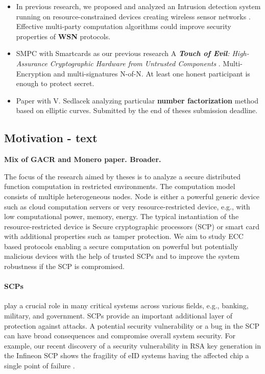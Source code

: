 \documentclass[
  digital, %
  twoside, %
  table,   %
  lof,     %
  lot,     %
]{fithesis3}
\theoremstyle{definition}
\theoremstyle{remark}
\begin{document}
\begin{ecmmnt}
\begin{itemize}
    \item In previous research, we proposed and analyzed an Intrusion detection system running on resource-constrained devices creating wireless sensor networks \cite{wsnprotectlayer}. Effective multi-party computation algorithms could improve security properties of {\bf{WSN}} protocols.
    
    \item SMPC with Smartcards as our previous research A {\it {\bf{Touch of Evil}}: High-Assurance Cryptographic Hardware from Untrusted Components} \cite{2017-ccs-mavroudis}. Multi-Encryption and multi-signatures N-of-N. At least one honest participant is enough to protect secret.
    
    \item Paper with V. Sedlacek analyzing particular {\bf{number factorization}} method based on elliptic curves. Submitted by the end of theses submission deadline.

\end{itemize}

\subsection{Motivation - text}

    {\bf{Mix of GACR and Monero paper. Broader.}}
    
    The focus of the research aimed by theses is to analyze a secure distributed function computation in restricted environments. The computation model consists of multiple heterogeneous nodes. Node is either a powerful generic device such as cloud computation servers or very resource-restricted device, e.g., with low computational power, memory, energy. The typical instantiation of the resource-restricted device is Secure cryptographic processors (SCP) or smart card with additional properties such as tamper protection. 
    We aim to study ECC based protocols enabling a secure computation on powerful but potentially malicious devices with the help of trusted SCPs and to improve the system robustness if the SCP is compromised.
    
    \paragraph{SCPs} play a crucial role in many critical systems across various fields, e.g., banking, military, and government.
    SCPs provide an important additional layer of protection against attacks. A potential security vulnerability or a bug in the SCP can have broad consequences and compromise overall system security. For example, our recent discovery of a security vulnerability in RSA key generation in the Infineon SCP shows the fragility of eID systems having the affected chip a single point of failure \cite{2017-ccs-nemec}. 
    

\end{ecmmnt}
\end{document}
